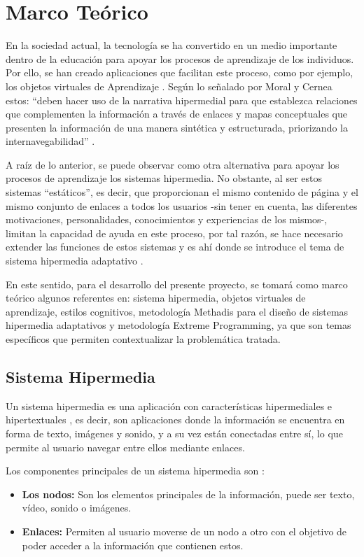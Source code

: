 \section{Marco Teórico}
En la sociedad actual, la tecnología se ha convertido en un medio importante dentro de la educación para apoyar los procesos de aprendizaje de los individuos. Por ello, se han creado aplicaciones que facilitan este proceso, como por ejemplo, los objetos virtuales de Aprendizaje \cite{Tovar2014}. Según lo señalado por Moral y Cernea \cite{DelMoral2005} estos: “deben hacer uso de la narrativa hipermedial para que establezca relaciones que complementen la información a través de enlaces y mapas conceptuales que presenten la información de una manera sintética y estructurada, priorizando la internavegabilidad” .

A raíz de lo anterior, se puede observar como otra alternativa para apoyar los procesos de aprendizaje los sistemas hipermedia. No obstante, al ser estos sistemas “estáticos”, es decir, que proporcionan el mismo contenido de página y el mismo conjunto de enlaces a todos los usuarios -sin tener en cuenta, las diferentes motivaciones, personalidades, conocimientos y experiencias de los mismos-, limitan la capacidad de ayuda en este proceso, por tal razón, se hace necesario extender las funciones de estos sistemas y es ahí donde se introduce el tema de sistema hipermedia adaptativo \cite{kubes2007}.

En este sentido, para el desarrollo del presente proyecto, se tomará como marco teórico algunos referentes en: sistema hipermedia, objetos virtuales de aprendizaje, estilos cognitivos, metodología Methadis para el diseño de sistemas hipermedia adaptativos y metodología Extreme Programming, ya que son temas específicos que permiten contextualizar la problemática tratada.

\subsection{Sistema Hipermedia}
Un sistema hipermedia es una aplicación con características hipermediales e hipertextuales \cite{Jose2004}, es decir, son aplicaciones donde la información se encuentra en forma de texto, imágenes y sonido, y a su vez están conectadas entre sí, lo que permite al usuario navegar entre ellos mediante enlaces.

Los componentes principales de un sistema hipermedia son \cite{Vrasidas2002}: 

\begin{itemize}
    \item \textbf{Los nodos:} Son los elementos principales de la información, puede ser texto, vídeo, sonido o imágenes. 
    \item \textbf{Enlaces:} Permiten al usuario moverse de un nodo a otro con el objetivo de poder acceder a la información que contienen estos. 
\end{itemize}

